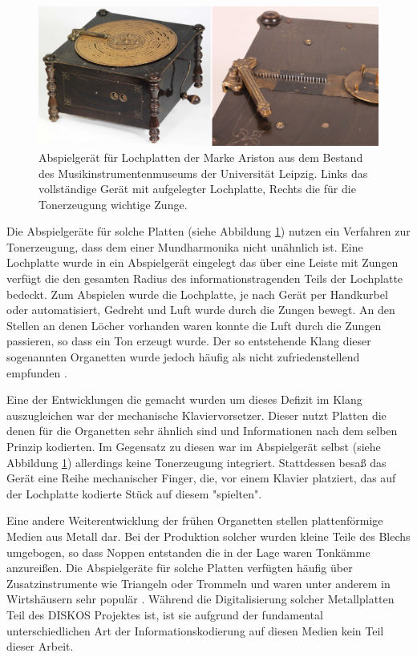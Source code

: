 \begin{figure}[t]
    \centering
    \includegraphics[width=\textwidth]{graphics/ariston_playback_device.png}
    \caption{Abspielgerät für Lochplatten der Marke Ariston aus dem Bestand des Musikinstrumentenmuseums der Universität Leipzig. Links das vollständige Gerät mit aufgelegter Lochplatte, Rechts die für die Tonerzeugung wichtige Zunge.}
    \label{aristonplayer}
\end{figure}

Die Abspielgeräte für solche Platten (siehe Abbildung \ref{aristonplayer}) nutzen ein Verfahren zur Tonerzeugung, dass dem einer Mundharmonika nicht unähnlich ist.
Eine Lochplatte wurde in ein Abspielgerät eingelegt das über eine Leiste mit Zungen verfügt die den gesamten Radius des informationstragenden Teils der Lochplatte bedeckt.
Zum Abspielen wurde die Lochplatte, je nach Gerät per Handkurbel oder automatisiert, Gedreht und Luft wurde durch die Zungen bewegt.
An den Stellen an denen Löcher vorhanden waren konnte die Luft durch die Zungen passieren, so dass ein Ton erzeugt wurde.
Der so entstehende Klang dieser sogenannten Organetten wurde jedoch häufig als nicht zufriedenstellend empfunden \parencite[III.5.c. Plattenspieldosen und Drehinstrumente]{mgg_mechanische}.

Eine der Entwicklungen die gemacht wurden um dieses Defizit im Klang auszugleichen war der mechanische Klaviervorsetzer.
Dieser nutzt Platten die denen für die Organetten sehr ähnlich sind und Informationen nach dem selben Prinzip kodierten.
Im Gegensatz zu diesen war im Abspielgerät selbst (siehe Abbildung \ref{aristonplayer}) allerdings keine Tonerzeugung integriert.
Stattdessen besaß das Gerät eine Reihe mechanischer Finger, die, vor einem Klavier platziert, das auf der Lochplatte kodierte Stück auf diesem "spielten".

Eine andere Weiterentwicklung der frühen Organetten stellen plattenförmige Medien aus Metall dar.
Bei der Produktion solcher wurden kleine Teile des Blechs umgebogen, so dass Noppen entstanden die in der Lage waren Tonkämme anzureißen.
Die Abspielgeräte für solche Platten verfügten häufig über Zusatzinstrumente wie Triangeln oder Trommeln und waren unter anderem in Wirtshäusern sehr populär \parencite[III.5.c. Plattenspieldosen und Drehinstrumente]{mgg_mechanische}.
Während die Digitalisierung solcher Metallplatten Teil des DISKOS Projektes ist, ist sie aufgrund der fundamental unterschiedlichen Art der Informationskodierung auf diesen Medien kein Teil dieser Arbeit.

